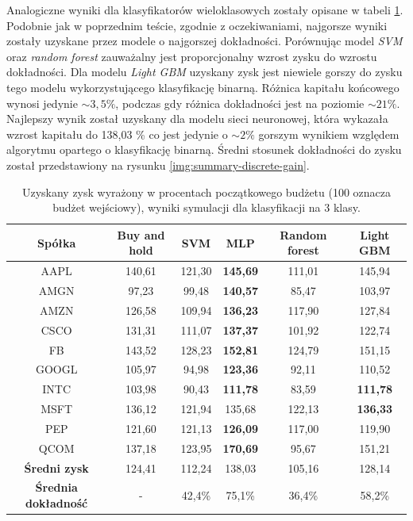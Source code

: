 \documentclass[a4paper, twoside, 11pt, openright]{article}
\begin{document}
Analogiczne wyniki dla klasyfikatorów wieloklasowych zostały opisane w tabeli \ref{tab:comparison_simulation_discrete}. Podobnie jak w poprzednim teście, zgodnie z oczekiwaniami, najgorsze wyniki zostały uzyskane przez modele o najgorszej dokładności. Porównując model \textit{SVM} oraz \textit{random forest} zauważalny jest proporcjonalny wzrost zysku do wzrostu dokładności. Dla modelu \textit{Light GBM} uzyskany zysk jest niewiele gorszy do zysku tego modelu wykorzystującego klasyfikację binarną. Różnica kapitału końcowego wynosi jedynie $\sim 3,5\%$, podczas gdy różnica dokładności jest na poziomie $\sim 21\%$. Najlepszy wynik został uzyskany dla modelu sieci neuronowej, która wykazała wzrost kapitału do 138,03 \% co jest jedynie o $\sim 2\%$ gorszym wynikiem względem algorytmu opartego o klasyfikację binarną. Średni stosunek dokładności do zysku został przedstawiony na rysunku \ref{img:summary-discrete-gain}.

 \begin{table}[H]
    \centering
    \begin{tabular}{|c|c|c|c|c|c|}
    \hline
        \textbf{Spółka}  & \textbf{Buy and hold} & \textbf{SVM} &  \textbf{MLP}  &  \textbf{Random forest}  &  \textbf{Light GBM} \\ \hline
AAPL & 140,61 & 121,30  & \textbf{145,69}  & 111,01 & 145,94 \\ \hline
AMGN & 97,23 & 99,48  & \textbf{140,57} & 85,47 &  103,97 \\ \hline
AMZN & 126,58 &  109,94 & \textbf{136,23} & 117,90 & 127,84 \\ \hline
CSCO & 131,31 & 111,07  & \textbf{137,37}  & 101,92 & 122,74  \\ \hline
FB   & 143,52 &  128,23 & \textbf{152,81} & 124,79 & 151,15 \\ \hline
GOOGL & 105,97 &  94,98 &  \textbf{123,36} & 92,11 & 110,52 \\ \hline
INTC & 103,98 & 90,43  & \textbf{111,78}  & 83,59 & \textbf{111,78} \\ \hline
MSFT &  136,12 & 121,94  &  135,68  & 122,13 & \textbf{136,33} \\ \hline
PEP  & 121,60 &  121,13 & \textbf{126,09} & 117,00 & 119,90 \\ \hline
QCOM & 137,18 &  123,95 &  \textbf{170,69} & 95,67 & 151,21 \\ \hline \hline
\textbf{Średni zysk} & 124,41 & 112,24 & 138,03 & 105,16 & 128,14 \\  \hline  
\textbf{Średnia dokładność} &  - & 42,4\% & 75,1\% &  36,4\% & 58,2\% \\  \hline  
    \end{tabular}
    \caption{Uzyskany zysk wyrażony w procentach początkowego budżetu (100 oznacza budżet wejściowy), wyniki symulacji dla klasyfikacji na 3 klasy.}
    \label{tab:comparison_simulation_discrete}
\end{table}   
\end{document}
